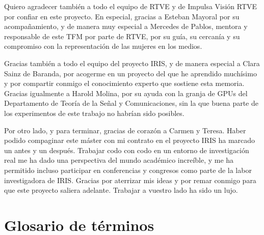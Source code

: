 \documentclass[12pt]{report} %
\renewcommand{\_}{\origunderscore\allowbreak}
\begin{document}
Quiero agradecer también a todo el equipo de RTVE y de Impulsa Visión RTVE por confiar en este proyecto. En especial, gracias a Esteban Mayoral por su acompañamiento, y de manera muy especial a Mercedes de Pablos, mentora y responsable de este TFM por parte de RTVE, por su guía, su cercanía y su compromiso con la representación de las mujeres en los medios.

Gracias también a todo el equipo del proyecto IRIS, y de manera especial a Clara Sainz de Baranda, por acogerme en un proyecto del que he aprendido muchísimo y por compartir conmigo el conocimiento experto que sostiene esta memoria. Gracias igualmente a Harold Molina, por su ayuda con la granja de GPUs del Departamento de Teoría de la Señal y Comunicaciones, sin la que buena parte de los experimentos de este trabajo no habrían sido posibles.

Por otro lado, y para terminar, gracias de corazón a Carmen y Teresa. Haber podido compaginar este máster con mi contrato en el proyecto IRIS ha marcado un antes y un después. Trabajar codo con codo en un entorno de investigación real me ha dado una perspectiva del mundo académico increíble, y me ha permitido incluso participar en conferencias y congresos como parte de la labor investigadora de IRIS. Gracias por aterrizar mis ideas y por remar conmigo para que este proyecto saliera adelante. Trabajar a vuestro lado ha sido un lujo.


		
	\vfill
	
	\newpage %
	\thispagestyle{empty}
	\mbox{}
	


\tableofcontents
\thispagestyle{fancy}

\newpage %
\thispagestyle{empty}
\mbox{}

\listoffigures
\thispagestyle{fancy}

\newpage %
\thispagestyle{empty}
\mbox{}

\listoftables
\thispagestyle{fancy}

\newpage %
\thispagestyle{empty}
\mbox{}

\chapter*{Glosario de términos}
\thispagestyle{fancy}

\end{document}
